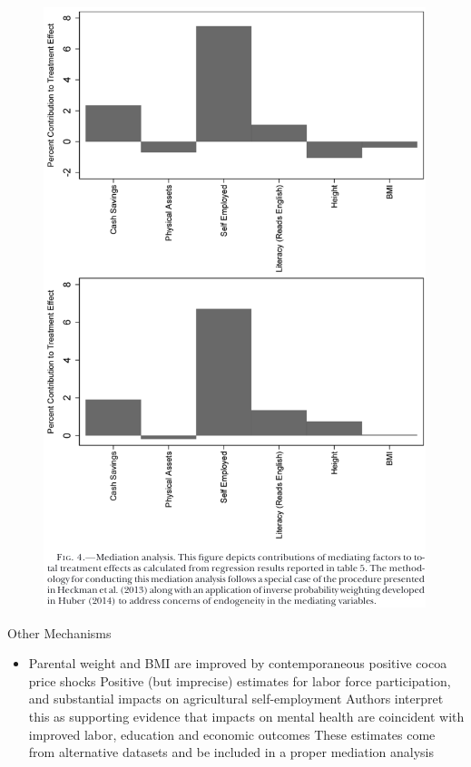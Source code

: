 \documentclass[dvipsnames]{beamer}
\begin{document}
    \begin{frame}
      \begin{figure}[htp]
        \centering
        \includegraphics[height=\textheight, keepaspectratio=true]{fig4.png}
      \end{figure}
    \end{frame}
    \begin{frame}{Other Mechanisms}
      \begin{itemize}
      \item Parental weight and BMI are improved by contemporaneous positive cocoa price shocks
        \vitem Positive (but imprecise) estimates for labor force participation, and substantial impacts on agricultural self-employment
        \vitem Authors interpret this as supporting evidence that impacts on mental health are coincident with improved labor, education and economic outcomes
        \vitem These estimates come from alternative datasets and  be included in a proper mediation analysis
      \end{itemize}
    \end{frame}
\end{document}
